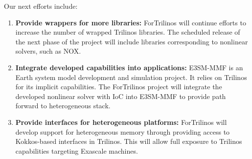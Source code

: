 Our next efforts include:
\begin{enumerate}
  \item \textbf{Provide wrappers for more libraries:} ForTrilinos will continue
    efforts to increase the number of wrapped Trilinos libraries. The scheduled
    release of the next phase of the project will include libraries
    corresponding to nonlinear solvers, such as NOX.
  \item \textbf{Integrate developed capabilities into applications:} E3SM-MMF
    is an Earth system model development and simulation project. It relies on
    Trilinos for its implicit capabilities. The ForTrilinos project will
    integrate the developed nonlinear solver with IoC into E3SM-MMF to provide
    path forward to heterogeneous stack.
  \item \textbf{Provide interfaces for heterogeneous platforms:} ForTrilinos
    will develop support for heterogeneous memory through providing access to
    Kokkos-based interfaces in Trilinos. This will allow full exposure to
    Trilinos capabilities targeting Exascale machines.
\end{enumerate}
